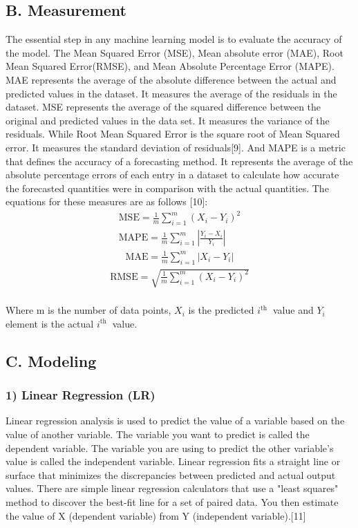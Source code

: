 \documentclass[conference]{IEEEtran}
\begin{document}
{\subsection*{B. Measurement}
\setlength{\parskip}{0pt}
The essential step in any machine learning model is to evaluate the accuracy of the model. The Mean Squared Error (MSE), Mean absolute error (MAE), Root Mean Squared Error(RMSE), and Mean Absolute Percentage Error (MAPE). MAE represents the average of the absolute difference between the actual and predicted values in the dataset. It measures the average of the residuals in the dataset. MSE represents the average of the squared difference between the original and predicted values in the data set. It measures the variance of the residuals. While Root Mean Squared Error is the square root of Mean Squared error. It measures the standard deviation of residuals[9]. And MAPE is a metric that defines the accuracy of a forecasting method. It represents the average of the absolute percentage errors of each entry in a dataset to calculate how accurate the forecasted quantities were in comparison with the actual quantities. The equations for these measures are as follows [10]:\\
\begin{gather*}
\text{MSE} = \frac{1}{m} \sum_{i=1}^{m}(X_{i}-Y_{i})^{2} \\
\text{MAPE} = \frac{1}{m} \sum_{i=1}^{m}\left\lvert\frac{Y_{i}-X_{i}}{Y_{i}}\right\rvert
\end{gather*}
\begin{gather*}
\text{MAE} = \frac{1}{m} \sum_{i=1}^{m}\lvert X_{i}-Y_{i} \rvert 
\end{gather*}
\begin{gather*}
\text{RMSE} = \sqrt{\frac{1}{m} \sum_{i=1}^{m}(X_{i}-Y_{i})^{2}} \\
\end{gather*}

Where $\mathrm{m}$ is the number of data points, $X_{i}$ is the predicted $i^{\text {th }}$ value and $Y_{i}$ element is the actual $i^{\text {th }}$ value.

\subsection*{C. Modeling}
\subsubsection*{\textbf{1) Linear Regression} (LR)}
Linear regression analysis is used to predict the value of a variable based on the value of another variable. The variable you want to predict is called the dependent variable. The variable you are using to predict the other variable's value is called the independent variable. Linear regression fits a straight line or surface that minimizes the discrepancies between predicted and actual output values. There are simple linear regression calculators that use a "least squares" method to discover the best-fit line for a set of paired data. You then estimate the value of $\mathrm{X}$ (dependent variable) from $\mathrm{Y}$ (independent variable).[11]

}
\end{document}
